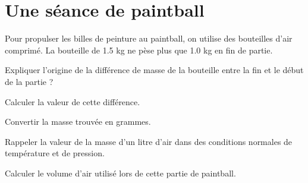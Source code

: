 \section{Une séance de paintball}

Pour propulser les billes de peinture au paintball, on utilise des bouteilles d'air comprimé.
La bouteille de \num{1.5} kg ne pèse plus que \num{1.0} kg en fin de partie.

\begin{questions}
	\question Expliquer l'origine de la différence de masse de la bouteille entre la fin et le début de la partie ?
	\fillwithdottedlines{2cm}
	
	\question Calculer la valeur de cette différence.
	\fillwithdottedlines{2cm}
	
	\question Convertir la masse trouvée en grammes.
	\fillwithdottedlines{2cm}
	
	\question Rappeler la valeur de la masse d'un litre d'air dans des conditions normales de température et de pression.
	\fillwithdottedlines{2cm}
	
	\question Calculer le volume d'air utilisé lors de cette partie de paintball.
	\fillwithdottedlines{3cm}
\end{questions}